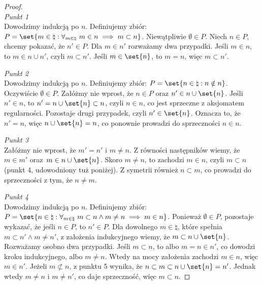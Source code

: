\begin{proof}
    \textit{\\Punkt 1}\\
    Dowodzimy indukcją po \( n \). Definiujemy zbiór: \( P = \set{m \in \natural : \forall_{m \in \natural} \ m \in n \implies m \subset n} \). Niewątpliwie \( \emptyset \in P \). Niech \( n \in P \), chcemy pokazać, że \( n' \in P \).
    Dla \( m \in n' \) rozważamy dwa przypadki. Jeśli \( m \in n \), to \( m \in n \cup n' \), czyli \( m \subset n' \). Jeśli \( m \in \set{n} \), to \( m = n \), więc \( m \subset n' \).
    
    \textit{Punkt 2}\\
    Dowodzimy indukcją po \( n \). Definiujemy zbiór: \( P = \set{n \in \natural : n \notin n} \). Oczywiście \( \emptyset \in P \). Załóżmy nie wprost, że \( n \in P \) oraz \( n' \in n \cup \set{n} \).
    Jeśli \( n' \in n \), to \( n' = n \cup \set{n} \subset n \), czyli \( n \in n \), co jest sprzeczne z aksjomatem regularności. Pozostaje drugi przypadek, czyli \( n' \in \set{n} \). Oznacza to, że \( n' = n \), więc \( n \cup \set{n}  = n \), co ponownie prowadzi do sprzeczności \( n \in n \).

    \textit{Punkt 3}\\
    Załóżmy nie wprost, że \( m' = n' \) i \( m \ne n \). Z równości następników wiemy, że \( m \in m' \) oraz~\( m \in n \cup \set{n} \).
    Skoro \( m \ne n \), to zachodzi \( m \in n \), czyli \( m \subset n \) (punkt 4, udowodniony tuż poniżej). Z symetrii również \( n \subset m \), co prowadzi do sprzeczności z tym, że \( n \ne m \).

    \textit{Punkt 4}\\
    Dowodzimy indukcją po \( n \). Definiujemy zbiór: \( P = \set{n \in \natural : \forall_{m \in \natural} \ m \subset n \land m \ne n \implies m \in n} \). Ponieważ \( \emptyset \in P \), pozostaje wykazać, że jeśli \( n \in P \), to \( n' \in P \).
    Dla dowolnego \( m \in \natural \), które spełnia \( m \subset n' \land m \ne n' \), z założenia indukcyjnego wiemy, że \( m \subset n \cup \set{n} \).
    Rozważamy osobno dwa przypadki. Jeśli \( m \subset n \), to albo \( m = n \in n' \), co dowodzi kroku indukcyjnego, albo \( m \ne n \). Wtedy na mocy założenia zachodzi \( m \in n \), więc  \( m \in n' \).
    Jeżeli \( m \not\subset n \), z punktu 5 wynika, że \( n \subset m \subset n \cup \set{n} = n' \). Jednak wtedy \( m \ne n \) i \( m \ne n' \), co daje sprzeczność, więc \( m \subset n \).


\end{proof}
